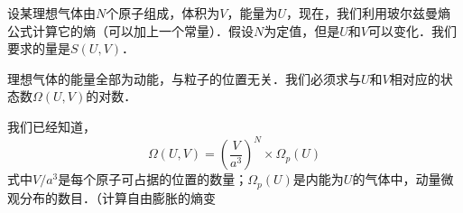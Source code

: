 
设某理想气体由$N $个原子组成，体积为$V$，能量为$U$，现在，我们利用玻尔兹曼熵公式计算它的熵（可以加上一个常量）．假设$N $为定值，但是$U $和$V $可以变化．我们要求的量是$S(U,V)$．

理想气体的能量全部为动能，与粒子的位置无关．我们必须求与$U$和$V$相对应的状态数$\Omega(U,V)$的对数．

我们已经知道，
\begin{equation}
\Omega \left( U,V \right) =\left( \frac{V}{a^3} \right) ^N\times \Omega _p\left( U \right) 
\end{equation}
式中$V/a^3$是每个原子可占据的位置的数量；$\Omega_p(U)$是内能为$U$的气体中，动量微观分布的数目．（计算自由膨胀的熵变